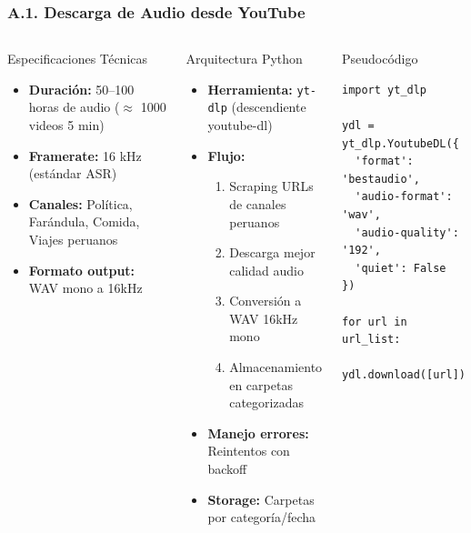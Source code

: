 \documentclass[aspectratio=169,10pt]{beamer}
\begin{document}
\begin{frame}[fragile]
  \frametitle{A.1. Descarga de Audio desde YouTube}
  
  \begin{columns}[T]
      \begin{block}{Especificaciones Técnicas}
        \small
        \begin{itemize}
          \item \textbf{Duración:} 50--100 horas de audio ($\approx$ 1000 videos 5 min)
          \item \textbf{Framerate:} 16 kHz (estándar ASR)
          \item \textbf{Canales:} Política, Farándula, Comida, Viajes peruanos
          \item \textbf{Formato output:} WAV mono a 16kHz
        \end{itemize}
      \end{block}

      \begin{block}{Arquitectura Python}
        \small
        \begin{itemize}
          \item \textbf{Herramienta:} \texttt{yt-dlp} (descendiente youtube-dl)
          \item \textbf{Flujo:}
          \begin{enumerate}[itemsep=1.1pt]
            \item Scraping URLs de canales peruanos
            \item Descarga mejor calidad audio
            \item Conversión a WAV 16kHz mono
            \item Almacenamiento en carpetas categorizadas
          \end{enumerate}
          \item \textbf{Manejo errores:} Reintentos con backoff
          \item \textbf{Storage:} Carpetas por categoría/fecha
        \end{itemize}
      \end{block}
    
      \vspace{-0.3cm}
      \begin{block}{Pseudocódigo}
        \tiny
        \begin{lstlisting}[basicstyle=\tiny\ttfamily,breaklines=true]
import yt_dlp

ydl = yt_dlp.YoutubeDL({
  'format': 'bestaudio',
  'audio-format': 'wav',
  'audio-quality': '192',
  'quiet': False
})

for url in url_list:
  ydl.download([url])
        \end{lstlisting}
      \end{block}
  \end{columns}
\end{frame}
\end{document}
